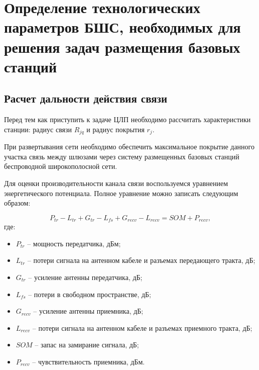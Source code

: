 \chapter{Определение технологических параметров БШС, необходимых для решения задач размещения базовых станций}\label{ch:ch1}

\section{Расчет дальности действия связи}


Перед тем как приступить к задаче ЦЛП необходимо рассчитать характеристики станции: радиус связи $R_{jq}$ и радиус покрытия $r_j$.

При развертывания сети необходимо обеспечить максимальное покрытие данного участка связь между шлюзами через систему размещенных базовых станций беспроводной широкополосной сети.

Для оценки производительности канала связи воспользуемся уравнением энергетического потенциала. Полное уравнение можно записать следующим образом:



\begin{equation}
  \label{eq:part3_link_budget}
  P_{tr} - L_{tr} + G_{tr} - L_{fs} + G_{recv} - L_{recv} = SOM + P_{recv},
\end{equation}
где:

\begin{itemize}

  \item $P_{tr}$ -- мощность передатчика, дБм;

  \item $L_{tr}$ -- потери сигнала на антенном кабеле и разъемах передающего тракта, дБ;

  \item $G_{tr}$ -- усиление антенны передатчика, дБ;

  \item $L_{fs}$ -- потери в свободном пространстве, дБ;

  \item $G_{recv}$ -- усиление антенны приемника, дБ;

  \item $L_{recv}$ -- потери сигнала на антенном кабеле и разъемах приемного тракта, дБ;

  \item $SOM$ -- запас на замирание сигнала, дБ;

  \item $P_{recv}$ -- чувствительность приемника, дБм.

\end{itemize}

